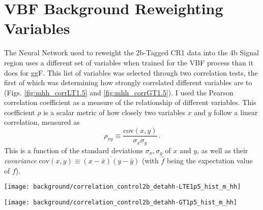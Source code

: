 \FloatBarrier
\section{VBF Background Reweighting Variables} \label{sec:vbf_bgdNNRW}

    The Neural Network used to reweight the 2b-Tagged CR1 data into the 4b Signal region
        uses a different set of variables when trained for the VBF process than it does for ggF.
    This list of variables was selected through two correlation tests,
        the first of which was determining how strongly correlated different variables are to \mhh
        (Figs. \ref{fig:mhh_corrLT1.5} and \ref{fig:mhh_corrGT1.5}).
    I used the Pearson correlation coefficient as a measure of the relationship of different variables.
    This coefficient $\rho$ is a scalar metric of how closely
        two variables $x$ and $y$ follow a linear correlation, measured as
        \begin{equation}
            \rho_{xy} \equiv \frac{\textrm{cov}(x,y)}{\sigma_x \sigma_y}
            \,.
        \end{equation}
    This is a function of the standard deviations $\sigma_x,\sigma_y$ of $x$ and $y$,
        as well as their \textit{covariance} 
        $\textrm{cov}(x,y) \equiv \overline{(x-\bar{x})(y-\bar{y})}$
        (with $\bar{f}$ being the expectation value of $f$)\cite{pearson_correlation}.


    \begin{sidewaysfigure}[tbh]
        \texttt{[image: background/correlation\_control2b\_detahh-LTE1p5\_hist\_m\_hh]}
        \caption{
            The Pearson Correlation Coefficients associated with \mhh for the 2b CR1 data,
                with $\deta \leq 1.5$.
            The higher up on the chart a variable is, the more strongly correlated it is to \mhh,
                with \mhh itself at the top with a coefficient of 1.
            Note that most of the VBF-specific variables, such as vbf\_mjj, are very poorly correlated to \mhh and thus not preferred.
        }
        \label{fig:mhh_corrLT1.5}
    \end{sidewaysfigure}

    \begin{sidewaysfigure}[tbh]
        \texttt{[image: background/correlation\_control2b\_detahh-GT1p5\_hist\_m\_hh]}
        \caption{
            The Pearson Correlation Coefficients associated with \mhh for the 2b CR1 data,
                with $\deta > 1.5$.
            The higher up on the chart a variable is, the more strongly correlated it is to \mhh,
                with \mhh itself at the top with a coefficient of 1.
            Note that most of the VBF-specific variables, such as vbf\_mjj, are very poorly correlated to \mhh and thus not preferred.
        }
        \label{fig:mhh_corrGT1.5}
    \end{sidewaysfigure}

